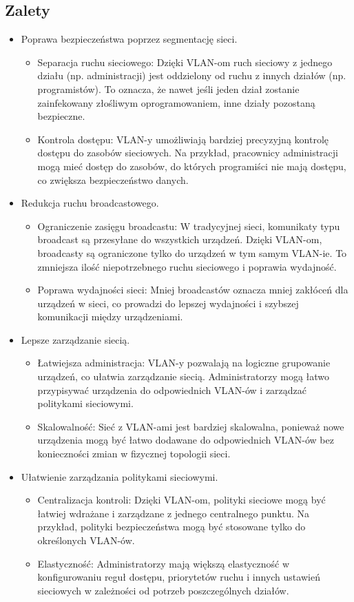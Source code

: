 \subsection{Zalety}
\begin{itemize}
    \item Poprawa bezpieczeństwa poprzez segmentację sieci. 
    \begin{itemize}
        \item Separacja ruchu sieciowego: Dzięki VLAN-om ruch sieciowy z jednego działu (np. administracji) jest oddzielony od ruchu z innych działów (np. programistów). To oznacza, że nawet jeśli jeden dział zostanie zainfekowany złośliwym oprogramowaniem, inne działy pozostaną bezpieczne.
        \item Kontrola dostępu: VLAN-y umożliwiają bardziej precyzyjną kontrolę dostępu do zasobów sieciowych. Na przykład, pracownicy administracji mogą mieć dostęp do zasobów, do których programiści nie mają dostępu, co zwiększa bezpieczeństwo danych.
    \end{itemize}
    \item Redukcja ruchu broadcastowego. 
    \begin{itemize}
        \item Ograniczenie zasięgu broadcastu: W tradycyjnej sieci, komunikaty typu broadcast są przesyłane do wszystkich urządzeń. Dzięki VLAN-om, broadcasty są ograniczone tylko do urządzeń w tym samym VLAN-ie. To zmniejsza ilość niepotrzebnego ruchu sieciowego i poprawia wydajność.
        \item Poprawa wydajności sieci: Mniej broadcastów oznacza mniej zakłóceń dla urządzeń w sieci, co prowadzi do lepszej wydajności i szybszej komunikacji między urządzeniami.
    \end{itemize}
    \item Lepsze zarządzanie siecią.
    \begin{itemize}
        \item Łatwiejsza administracja: VLAN-y pozwalają na logiczne grupowanie urządzeń, co ułatwia zarządzanie siecią. Administratorzy mogą łatwo przypisywać urządzenia do odpowiednich VLAN-ów i zarządzać politykami sieciowymi.
        \item Skalowalność: Sieć z VLAN-ami jest bardziej skalowalna, ponieważ nowe urządzenia mogą być łatwo dodawane do odpowiednich VLAN-ów bez konieczności zmian w fizycznej topologii sieci.
    \end{itemize}
    \item Ułatwienie zarządzania politykami sieciowymi.
    \begin{itemize}
        \item Centralizacja kontroli: Dzięki VLAN-om, polityki sieciowe mogą być łatwiej wdrażane i zarządzane z jednego centralnego punktu. Na przykład, polityki bezpieczeństwa mogą być stosowane tylko do określonych VLAN-ów.
        \item Elastyczność: Administratorzy mają większą elastyczność w konfigurowaniu reguł dostępu, priorytetów ruchu i innych ustawień sieciowych w zależności od potrzeb poszczególnych działów.
    \end{itemize}
\end{itemize}

